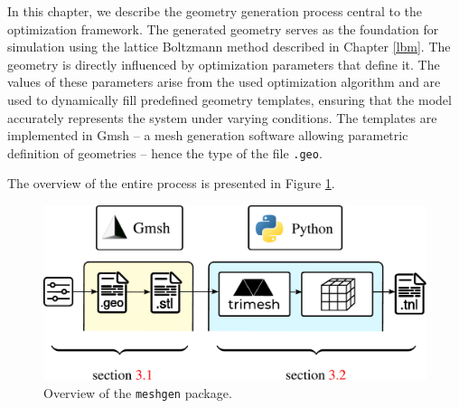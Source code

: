 In this chapter, we describe the geometry generation process central to the optimization framework. The generated geometry serves as the foundation for simulation using the lattice Boltzmann method described in Chapter \ref{lbm}. The geometry is directly influenced by optimization parameters that define it. The values of these parameters arise from the used optimization algorithm and are used to dynamically fill predefined geometry templates, ensuring that the model accurately represents the system under varying conditions. The templates are implemented in Gmsh -- a mesh generation software allowing parametric definition of geometries \cite{gmsh} -- hence the type of the file \texttt{.geo}.

The overview of the entire process is presented in Figure \ref{fig:meshgen overview}.


\begin{figure}[H]
	\centering
	\vspace{6mm}
	\includegraphics[width=.85\textwidth]{figures/meshgen.pdf}
	\vspace{4mm}
	\caption{Overview of the \texttt{meshgen} package.}
	\label{fig:meshgen overview}
\end{figure}
